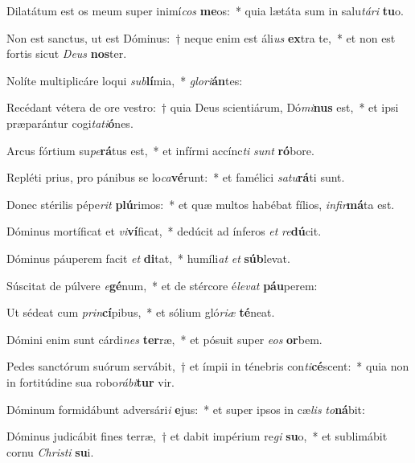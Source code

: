 \item Dilatátum est os meum super inimí\textit{cos} \textbf{me}os:~* quia lætáta sum in salu\textit{tá}\textit{ri} \textbf{tu}o.
\item Non est sanctus, ut est Dóminus:~† neque enim est áli\textit{us} \textbf{ex}tra te,~* et non est fortis sicut \textit{De}\textit{us} \textbf{nos}ter.
\item Nolíte multiplicáre loqui \textit{sub}\textbf{lí}mia,~* \textit{glo}\textit{ri}\textbf{án}tes:
\item Recédant vétera de ore vestro:~† quia Deus scientiárum, Dó\textit{mi}\textbf{nus} est,~* et ipsi præparántur cogi\textit{ta}\textit{ti}\textbf{ó}nes.
\item Arcus fórtium su\textit{pe}\textbf{rá}tus est,~* et infírmi accínc\textit{ti} \textit{sunt} \textbf{ró}bore.
\item Repléti prius, pro pánibus se lo\textit{ca}\textbf{vé}runt:~* et famélici \textit{sa}\textit{tu}\textbf{rá}ti sunt.
\item Donec stérilis pépe\textit{rit} \textbf{plú}rimos:~* et quæ multos habébat fílios, \textit{in}\textit{fir}\textbf{má}ta est.
\item Dóminus mortíficat et \textit{vi}\textbf{ví}ficat,~* dedúcit ad ínferos \textit{et} \textit{re}\textbf{dú}cit.
\item Dóminus páuperem facit \textit{et} \textbf{di}tat,~* humíli\textit{at} \textit{et} \textbf{súb}levat.
\item Súscitat de púlvere \textit{e}\textbf{gé}num,~* et de stércore é\textit{le}\textit{vat} \textbf{páu}perem:
\item Ut sédeat cum \textit{prin}\textbf{cí}pibus,~* et sólium gló\textit{ri}\textit{æ} \textbf{té}neat.
\item Dómini enim sunt cárdi\textit{nes} \textbf{ter}ræ,~* et pósuit super \textit{e}\textit{os} \textbf{or}bem.
\item Pedes sanctórum suórum servábit,~† et ímpii in ténebris con\textit{ti}\textbf{cé}scent:~* quia non in fortitúdine sua robo\textit{rá}\textit{bi}\textbf{tur} vir.
\item Dóminum formidábunt adversári\textit{i} \textbf{e}jus:~* et super ipsos in cæ\textit{lis} \textit{to}\textbf{ná}bit:
\item Dóminus judicábit fines terræ,~† et dabit impérium re\textit{gi} \textbf{su}o,~* et sublimábit cornu \textit{Chris}\textit{ti} \textbf{su}i.
